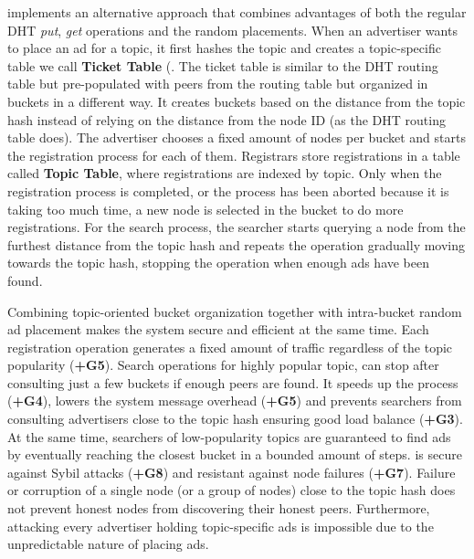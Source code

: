 \sysname implements an alternative approach that combines advantages of both the regular DHT \emph{put}, \emph{get} operations and the random placements. 
When an advertiser wants to place an ad for a topic,  it first hashes the topic and creates a topic-specific table we call \textbf{Ticket Table} (. 
The ticket table is similar to the DHT routing table but pre-populated with peers from the routing table but organized in buckets in a different way. 
It creates buckets based on the distance from the topic hash instead of relying on the distance from the node ID (as the DHT routing table does). 
The advertiser chooses a fixed amount of nodes per bucket and starts the registration process for each of them.
Registrars store registrations in a table called \textbf{Topic Table},  where registrations are indexed by topic.
Only when the registration process is completed, or the process has been aborted because it is taking too much time, a new node is selected in the bucket to do more registrations. 
For the search process,  the searcher starts querying  a node from the furthest distance from the topic hash and repeats the operation gradually moving towards the topic hash,  stopping the operation when enough ads have been found.

Combining topic-oriented bucket organization together with intra-bucket random ad placement makes the system secure and efficient at the same time. 
Each registration operation generates a fixed amount of traffic regardless of the topic popularity (\textbf{+G5}). 
Search operations for highly popular topic, can stop after consulting just a few buckets if enough peers are found. 
It speeds up the process (\textbf{+G4}), lowers the system message overhead (\textbf{+G5}) and prevents searchers from consulting advertisers close to the topic hash ensuring good load balance (\textbf{+G3}). 
At the same time, searchers of low-popularity topics are guaranteed to find ads by eventually reaching the closest bucket in a bounded amount of steps. 
\sysname is secure against Sybil attacks (\textbf{+G8}) and resistant against node failures (\textbf{+G7}). Failure or corruption of a single node (or a group of nodes) close to the topic hash does not prevent honest nodes from discovering their honest peers. 
Furthermore, attacking every advertiser holding topic-specific ads is impossible due to the unpredictable nature of placing ads. 



